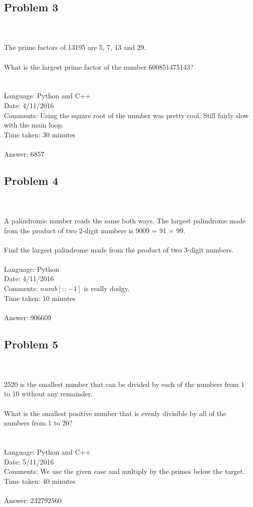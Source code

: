 \documentclass[fleqn]{article}
\begin{document}
\pagebreak
\subsection{Problem 3} ~\\
	\\
	The prime factors of 13195 are 5, 7, 13 and 29.\\
	\\
	What is the largest prime factor of the number 600851475143?\\
	\\
	\\
	Language: Python and C++ \\
	Date: 4/11/2016 \\
	Comments: Using the square root of the number was pretty cool. Still fairly slow with the main loop.\\
	Time taken: 30 minutes\\
	\\
	Answer:  6857\\
	
\subsection{Problem 4} ~\\
	\\
	A palindromic number reads the same both ways. The largest
	palindrome made from the product of two 2-digit numbers
	is 9009 = 91 $\times$ 99.\\
	\\
	Find the largest palindrome made from the product of two 3-digit
	numbers.
	\\
	\\
	Language: Python\\
	Date: 4/11/2016 \\
	Comments: $numb[::-1]$ is really dodgy.\\
	Time taken: 10 minutes\\
	\\
	Answer:  906609\\
\pagebreak
\subsection{Problem 5} ~\\
	\\
	2520 is the smallest number that can be divided by each of the numbers from 1 to 10 without any remainder.\\
	\\
	What is the smallest positive number that is evenly divisible by all of the numbers from 1 to 20?\\
	\\
	\\
	Language: Python and C++\\
	Date: 5/11/2016 \\
	Comments: We use the given case and multiply by the primes below the target.
	Time taken: 40 minutes\\
	\\
	Answer:  232792560\\
	
\end{document}

